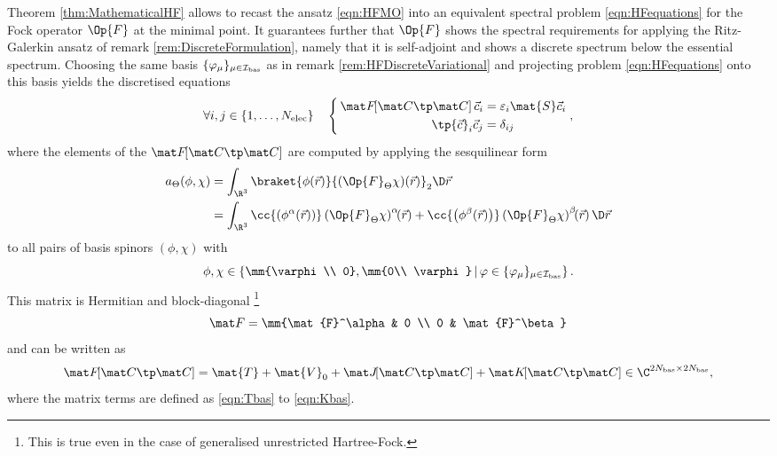 \begin{rem}
Theorem \vref{thm:MathematicalHF} allows to recast
the \HF ansatz \eqref{eqn:HFMO} into an equivalent
spectral problem \eqref{eqn:HFequations}
for the Fock operator $\Op{F}$ at the minimal point.
It guarantees further that $\Op{F}$
shows the spectral requirements for applying the Ritz-Galerkin ansatz
of remark \vref{rem:DiscreteFormulation},
namely that it is self-adjoint and shows
a discrete spectrum below the essential spectrum.
Choosing the same basis $\{\varphi_\mu\}_{\mu\in\mathcal{I}_\text{bas}}$
as in remark \ref{rem:HFDiscreteVariational}
and projecting problem \eqref{eqn:HFequations} onto this basis
yields the discretised \HF equations
\begin{equation}
	\forall i,j \in \{1,\ldots,\Nelec\} \quad
	\left\{
	\begin{aligned}
	\, \matFfull \vec{c}_i &= \varepsilon_i \mat{S} \vec{c}_i \\
	   \tp{\vec{c}}_i \vec{c}_j &= \delta_{ij}
	\end{aligned}
	\right. ,
	\label{eqn:HFDiscreteEquations}
\end{equation}
where the elements of the  $\matFfull$
are computed by applying the sesquilinear form
\begin{equation}
	\begin{aligned}
	a_\Theta(\phi,\chi)
		&= \int_{\R^3} \braket{\phi(\vec{r})}{ \left(\Op{F}_\Theta \chi\right)\!(\vec{r})}_2
			\D \vec{r} \\
		&= \int_{\R^3}
			\cc{\left(\phi^\alpha(\vec{r})\right)}
				\left(\Op{F}_\Theta\chi\right)^\alpha\!\!(\vec{r})
			+ \cc{\left(\phi^\beta(\vec{r})\right)}
				\left(\Op{F}_\Theta\chi\right)^\beta\!\!(\vec{r}) \,\D \vec{r}
	\end{aligned}
	\label{eqn:SesquilinearFormFock}
\end{equation}
to all pairs of basis spinors $(\phi, \chi)$ with
\[ \phi, \chi \in \left\{ \mm{\varphi\\ 0}, \mm{0\\ \varphi} \,\middle|\,
	\varphi \in \{\varphi_\mu\}_{\mu\in\Ibas} \right\}.
\]
This matrix is Hermitian and block-diagonal%
\footnote{This is true even in the case of generalised unrestricted Hartree-Fock.}
\[ \matF = \mm{\mat{F}^\alpha & 0 \\ 0 & \mat{F}^\beta} \]
and can be written as
\begin{equation}
	\matFfull = \mat{T} + \mat{V}_0 + \matJfull + \matKfull \in \C^{2\Nbas\times 2\Nbas},
	\label{eqn:FockMatrix}
\end{equation}
where the matrix terms are defined as \eqref{eqn:Tbas} to \eqref{eqn:Kbas}.


\end{rem}
